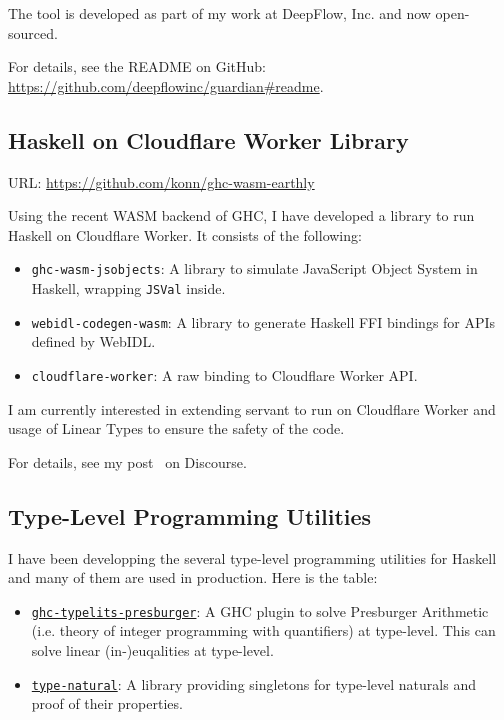 \documentclass{moderncv}
\begin{document}
The tool is developed as part of my work at DeepFlow, Inc. and now open-sourced.

For details, see the README on GitHub: \url{https://github.com/deepflowinc/guardian#readme}.

\subsection{Haskell on Cloudflare Worker Library}
URL: \url{https://github.com/konn/ghc-wasm-earthly}

Using the recent WASM backend of GHC, I have developed a library to run Haskell on Cloudflare Worker.
It consists of the following:

\begin{itemize}
  \item \texttt{ghc-wasm-jsobjects}: A library to simulate JavaScript Object System in Haskell, wrapping \texttt{JSVal} inside.
  \item \texttt{webidl-codegen-wasm}: A library to generate Haskell FFI bindings for APIs defined by WebIDL.
  \item \texttt{cloudflare-worker}: A raw binding to Cloudflare Worker API.
\end{itemize}

I am currently interested in extending servant to run on Cloudflare Worker and usage of Linear Types to ensure the safety of the code.

For details, see my post~\cite{ISHII:2024ws} on Discourse.

\subsection{Type-Level Programming Utilities}

I have been developping the several type-level programming utilities for Haskell and many of them are used in production.
Here is the table:

\begin{itemize}
  \item \href{http://hackage.haskell.org/package/ghc-typelits-presburger}{\texttt{ghc-typelits-presburger}}: A GHC plugin to solve Presburger Arithmetic (i.e. theory of integer programming with quantifiers) at type-level. This can solve linear (in-)euqalities at type-level.
  \item \href{http://hackage.haskell.org/package/type-natural}{\texttt{type-natural}}: A library providing singletons for type-level naturals and proof of their properties.
\end{itemize}
\end{document}
